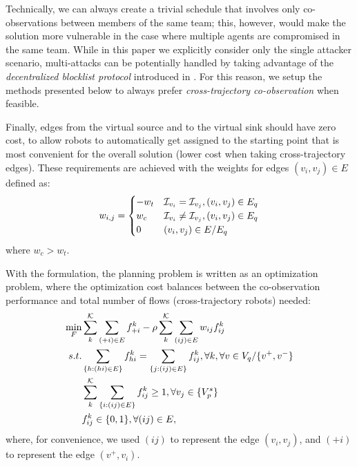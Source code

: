 \documentclass[10pt,twocolumn,twoside]{IEEEtran}
\begin{document}
Technically, we can always create a trivial schedule that involves only co-observations between members of the same team; this, however, would make the solution more vulnerable in the case where multiple agents are compromised in the same team. While in this paper we explicitly consider only the single attacker scenario, multi-attacks can be potentially handled by taking advantage of the \emph{decentralized blocklist protocol} introduced in \cite{wardega2023byzantine}. For this reason, we setup the methods presented below to always prefer \emph{cross-trajectory co-observation} when feasible.

Finally, edges from the virtual source and to the virtual sink should have zero cost, to allow robots to automatically get assigned to the starting point that is most convenient for the overall solution (lower cost when taking cross-trajectory edges).
These requirements are achieved with the weights for edges $(v_{i},v_{j})\in E$ defined as:
\begin{equation}
	w_{i,j}=\begin{cases}
	-w_{t} & \mathcal{I}_{v_{i}}=\mathcal{I}_{v_{j}}, (v_{i},v_{j})\in E_{q}\\
	w_{c} & \mathcal{I}_{v_{i}} \neq \mathcal{I}_{v_{j}}, (v_{i},v_{j})\in E_{q}\\
	0 &  (v_{i},v_{j})\in E / E_{q} 
	\end{cases}
\end{equation}
where $w_{c} > w_{t}$. 

With the formulation, the planning problem is written as an optimization problem, where the optimization cost balances between the co-observation performance and total number of flows (cross-trajectory robots) needed:
 \begin{subequations} \label{eq:flow-coverage-problem}
     \begin{align}
        \min_{F} &\sum^{\mathcal{K}}_{k} \sum_{(+i)\in E} f^{k}_{+i} - \rho \sum^{\mathcal{K}}_k \sum_{(ij)\in E} w_{ij} f^k_{ij} \label{eq:flow-cost}\\
        s.t. & \sum_{\{h:(hi) \in E\}}f^k_{hi}=\sum_{\{j:(ij) \in E\}}f^k_{ij},  \forall k,\forall v \in V_{q} / \{v^{+}, v^{-}\}  \label{eq:FlowBalanceConstraint}\\
        & \sum^{\mathcal{K}}_k\sum_{\{i:(ij)\in E \}} f^k_{ij} \geq 1, \forall v_{j} \in \{V^{s}_{p}\} \label{eq:FlowCoverage}\\
        & f^k_{ij} \in \{0,1\} ,  \forall (ij)\in E ,\label{eq:SingleFLowCapacity}
     \end{align}
 \end{subequations}
where, for convenience, we used $(ij)$ to represent the edge $(v_{i},v_{j})$, and $(+i)$ to represent the edge $(v^{+},v_{i})$.
\end{document}
